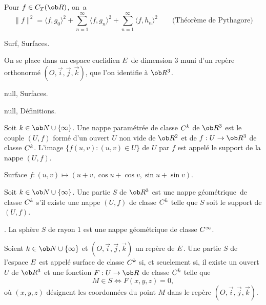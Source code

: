Pour $f\in\sc C_T(\ob R)$, on~a 
$$
\|f\|^2=\langle f,g_0\rangle^2+\sum_{n=1}^\infty\langle f,g_n\rangle^2
+\sum_{n=1}^\infty\langle f,h_n\rangle^2\qquad \mbox{(Théorème de Pythagore)}
$$







%

\Chapter Surf, Surfaces.



On se place dans un espace euclidien $\sc E$ de dimension $3$ 
muni d'un repère orthonormé $(O,\vec i,\vec j,\vec k)$, que l'on identifie à $\ob R^3$. 
\bigskip

\Section null, Surfaces.

\Subsection null, Définitions.

\Definition [] Soit $k\in\ob N\cup\{\infty\}$. Une nappe paramétrée de classe $\sc C^k$ de $\ob R^3$ 
est le couple $(U,f)$ formé d'un ouvert $U$ non vide de $\ob R^2$ 
et de $f:U\to\ob R^3$ de classe $\sc C^k$. \smallskip\noindent
L'image $\{f(u,v):(u,v)\in U\}$ de $U$ par $f$ est appelé le support de la nappe $(U,f)$. 

\centerline{%
}%
\Figure [Index=Surfaces] Surface $f:(u,v)\mapsto(u+v,\cos u+\cos v,\sin u+\sin v)$.

\Definition [] Soit $k\in\ob N\cup\{\infty\}$. Une partie $S$ de $\ob R^3$ 
est une nappe géométrique~de classe $\sc C^k$ 
s'il existe une nappe $(U,f)$ de classe $\sc C^k$ 
telle que $S$ soit le support de $(U,f)$. 
\bigskip

\Exemple. La sphère $S$ de rayon $1$ est une nappe géométrique de classe $\sc C^\infty$. 
\bigskip

\Definition [] Soient $k\in\ob N\cup\{\infty\}$ et $(O,\vec i,\vec j,\vec k)$ un repère de $\sc E$. 
Une partie $S$ de l'espace $\sc E$ est appelé surface de classe $\sc C^k$ 
si, et seuelement si, il existe un ouvert $U$ de $\ob R^3$ 
et une fonction $F:U\to\ob R$ de classe $\sc C^k$ telle que 
$$
M\in S\Longleftrightarrow F(x,y,z)=0, 
$$
où $(x,y,z)$ désignent les coordonnées 
du point $M$ dans le repère $(O,\vec i,\vec j,\vec k)$. 
\bigskip

